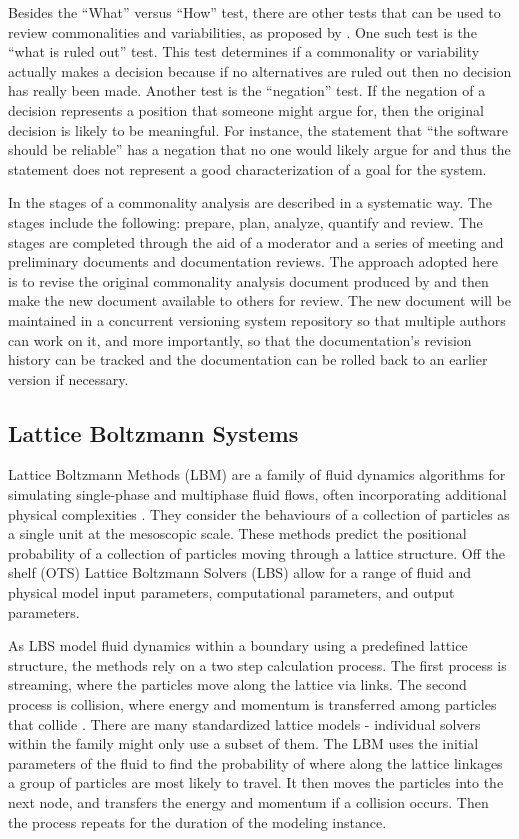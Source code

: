 \documentclass[12pt]{article}
\begin{document}
Besides the “What” versus “How” test, there are other tests that can be used to review commonalities and variabilities, as proposed by \cite{weiss1997defining}. One such test is the “what is ruled out” test. This test determines if a commonality or variability actually makes a decision because if no alternatives are ruled out then no decision has really been made. Another test is the “negation” test. If the negation of a decision represents a position that someone might argue for, then the original decision is likely to be meaningful. For instance, the statement that “the software should be reliable” has a negation that no one would likely argue for and thus the statement does not represent a good characterization of a goal for the system. 

In \cite{weiss1997defining} the stages of a commonality analysis are described in a systematic way. The stages include the following: prepare, plan, analyze, quantify and review. The stages are completed through the aid of a moderator and a series of meeting and preliminary documents and documentation reviews. The approach adopted here is to revise the original commonality analysis document produced by \cite{chen2003} and then make the new document available to others for review. The new document will be maintained in a concurrent versioning system repository so that multiple authors can work on it, and more importantly, so that the documentation’s revision history can be tracked and the documentation can be rolled back to an earlier version if necessary.

\subsection{Lattice Boltzmann Systems}
Lattice Boltzmann Methods (LBM) are a family of fluid dynamics algorithms for simulating single-phase and multiphase fluid flows, often incorporating additional physical complexities \citep{chen1998lattice}. They consider the behaviours of a collection of particles as a single unit at the mesoscopic scale. These methods predict the positional probability of a collection of particles moving through a lattice structure. Off the shelf (OTS) Lattice Boltzmann Solvers (LBS) allow for a range of fluid and physical model input parameters, computational parameters, and output parameters.

As LBS model fluid dynamics within a boundary using a predefined lattice structure, the methods rely on a two step calculation process. The first process is streaming, where the particles move along the lattice via links. The second process is collision, where energy and momentum is transferred among particles that collide \citep{bao2011lattice}.
There are many standardized lattice models - individual solvers within the family might only use a subset of them.
The LBM uses the initial parameters of the fluid to find the probability of where along the lattice linkages a group of particles are most likely to travel. It then moves the particles into the next node, and transfers the energy and momentum if a collision occurs. Then the process repeats for the duration of the modeling instance.
\end{document}
